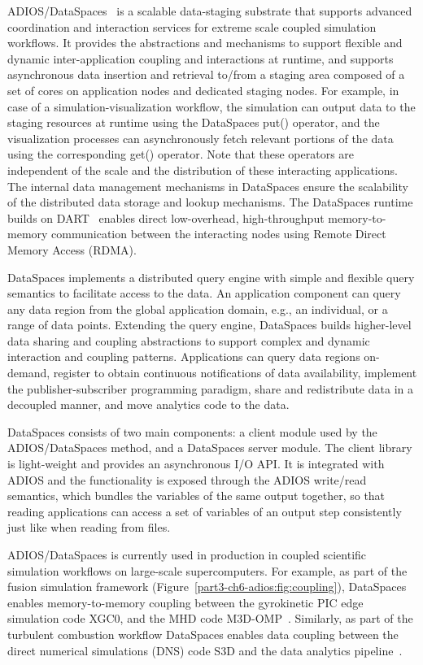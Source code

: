 ADIOS/DataSpaces~\cite{ADIOS:Docan:cluster12} is a scalable data-staging substrate that supports advanced coordination and interaction services for extreme scale coupled simulation workflows. It provides the abstractions and mechanisms to support flexible and dynamic inter-application coupling and interactions at runtime, and supports asynchronous data insertion and retrieval to/from a staging area composed of a set of cores on application nodes and dedicated staging nodes. For example, in case of a simulation-visualization workflow, the simulation can output data to the staging resources at runtime using the DataSpaces put() operator, and the visualization processes can asynchronously fetch relevant portions of the data using the corresponding get() operator. Note that these operators are independent of the scale and the distribution of these interacting applications. The internal data management mechanisms in DataSpaces ensure the scalability of the distributed data storage and lookup mechanisms. The DataSpaces runtime builds on DART~\cite{ADIOS:Docan:ccpe10} enables direct low-overhead, high-throughput memory-to-memory communication between the interacting nodes using Remote Direct Memory Access (RDMA). 

DataSpaces implements a distributed query engine with simple and flexible query semantics to facilitate access to the data. An application component can query any data region from the global application domain, e.g., an individual, or a range of data points. Extending the query engine, DataSpaces builds higher-level data sharing and coupling abstractions to support complex and dynamic interaction and coupling patterns. Applications can query data regions on-demand, register to obtain continuous notifications of data availability, implement the publisher-subscriber programming paradigm, share and redistribute data in a decoupled manner, and move analytics code to the data.

DataSpaces consists of two main components: a client module used by the ADIOS/DataSpaces method, and a DataSpaces server module. The client library is light-weight and provides an asynchronous I/O API. It is integrated with ADIOS and the functionality is exposed through the ADIOS write/read semantics, which bundles the variables of the same output together, so that reading applications can access a set of variables of an output step consistently just like when reading from files.

ADIOS/DataSpaces is currently used in production in coupled scientific simulation workflows on large-scale supercomputers. For example, as part of the fusion simulation framework (Figure~\ref{part3-ch6-adios:fig:coupling}), DataSpaces enables memory-to-memory coupling between the gyrokinetic PIC edge simulation code XGC0, and the MHD code M3D-OMP~\cite{ADIOS:Docan:ccgrid10}. Similarly, as part of the turbulent combustion workflow DataSpaces enables data coupling between the direct numerical simulations (DNS) code S3D and the data analytics pipeline~\cite{ADIOS:Bennett:SC12}.

